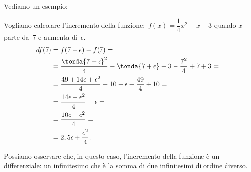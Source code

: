 \begin{minipage}{.48 \textwidth}
Vediamo un esempio: 

Vogliamo calcolare l'incremento della 
funzione:~\(f(x) = \dfrac{1}{4} x^2 -x -3\)
quando \(x\) parte da~\(7\) e aumenta di~\(\epsilon\).
\begin{align*}
  df(7) &= f(7+\epsilon) - f(7) = \\
        &= \dfrac{\tonda{7 +\epsilon}^2}{4}  -\tonda{7 +\epsilon} -3 - 
           \dfrac{7^2}{4}  +7 +3 =\\
        &= \dfrac{49 +14 \epsilon +\epsilon^2}{4} -10 -\epsilon - 
           \dfrac{49}{4} +10 =\\
        &= \dfrac{14 \epsilon +\epsilon^2}{4} -\epsilon =\\
        &= \dfrac{10 \epsilon +\epsilon^2}{4} =\\
        &= 2,5 \epsilon + \dfrac{\epsilon^2}{4}. %
\end{align*}
\end{minipage}
 \hfill
\begin{minipage}{.48 \textwidth}
 \begin{center}
\differenziale
 \end{center}
\end{minipage}

Possiamo osservare che, in questo caso, l'incremento della funzione è 
un differenziale: un infinitesimo che è la somma di due infinitesimi di 
ordine diverso.

